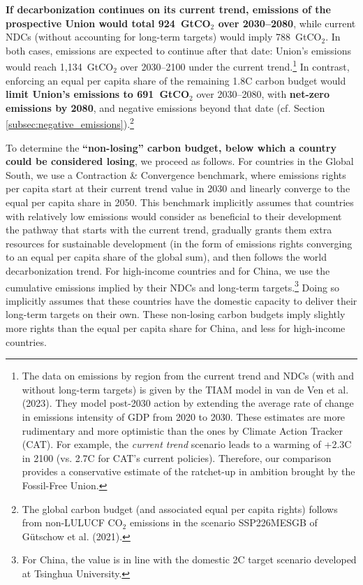 \documentclass[12pt,english]{article}
\begin{document}
\textbf{If decarbonization continues on its current trend, emissions of the prospective Union would total 924~GtCO$_\text{2}$ over 2030--2080}, while current NDCs (without accounting for long-term targets) would imply 788~GtCO$_\text{2}$. In both cases, emissions are expected to continue after that date: Union's emissions would reach 1,134~GtCO$_\text{2}$ over 2030--2100 under the current trend.\footnote{The data on emissions by region from the current trend and NDCs (with and without long-term targets) is given by the TIAM model in van de Ven et al. (2023)\cite{van_de_ven_multimodel_2023}. They model post-2030 action by extending the average rate of change in emissions intensity of GDP from 2020 to 2030. These estimates are more rudimentary and more optimistic than the ones by Climate Action Tracker (CAT). For example, the \textit{current trend} scenario leads to a warming of +2.3\textdegree{}C in 2100 (vs. 2.7\textdegree{}C for CAT's current policies). Therefore, our comparison provides a conservative estimate of the ratchet-up in ambition brought by the Fossil-Free Union.} %
In contrast, enforcing an equal per capita share of the remaining 1.8\textdegree{}C carbon budget would \textbf{limit Union's emissions to 691~GtCO$_\text{2}$} over 2030--2080, with \textbf{net-zero emissions by 2080}, and negative emissions beyond that date (cf. Section \ref{subsec:negative_emissions}).\footnote{The global carbon budget (and associated equal per capita rights) follows from non-LULUCF CO$_\text{2}$ emissions in the scenario SSP226MESGB of Gütschow et al. (2021).\cite{gutschow_country-resolved_2021}} %

To determine the \textbf{``non-losing'' carbon budget, below which a country could be considered losing}, we proceed as follows. For countries in the Global South, %
we use a Contraction \& Convergence benchmark, where emissions rights per capita start at their current trend value in 2030 and linearly converge to the equal per capita share in 2050. This benchmark implicitly assumes that countries with relatively low emissions would consider as beneficial to their development the pathway that starts with the current trend, gradually grants them extra resources for sustainable development (in the form of emissions rights converging to an equal per capita share of the global sum), and then follows the world decarbonization trend. 
For high-income countries and for China, we use the cumulative emissions implied by their NDCs and long-term targets.\footnote{For China, the value is in line with the domestic 2\textdegree{}C target scenario developed at Tsinghua University.\cite{he_towards_2022}} Doing so implicitly assumes that these countries have the domestic capacity to deliver their long-term targets on their own. These non-losing carbon budgets imply slightly more rights than the equal per capita share for China, and less for high-income countries. 
\end{document}
